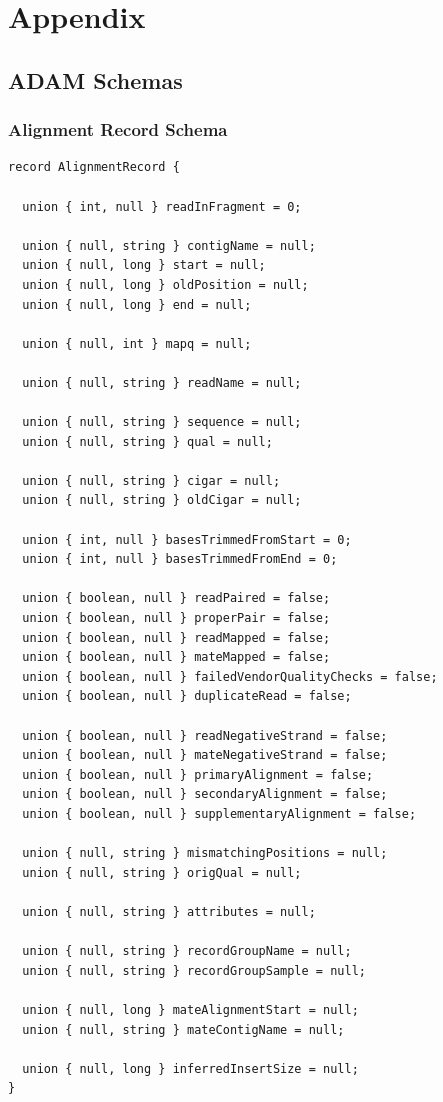 \documentclass[phd]{ucbthesis}
\begin{document}
\appendix

\part{Appendix}

\chapter{ADAM Schemas}
\label{chap:schemas}

\section{Alignment Record Schema}
\label{sec:alignment-record}

\begin{lstlisting}[caption={ADAM} read schema]
record AlignmentRecord {
 
  union { int, null } readInFragment = 0;

  union { null, string } contigName = null;
  union { null, long } start = null;
  union { null, long } oldPosition = null;
  union { null, long } end = null;

  union { null, int } mapq = null;

  union { null, string } readName = null;

  union { null, string } sequence = null;
  union { null, string } qual = null;

  union { null, string } cigar = null;
  union { null, string } oldCigar = null;

  union { int, null } basesTrimmedFromStart = 0;
  union { int, null } basesTrimmedFromEnd = 0;

  union { boolean, null } readPaired = false;
  union { boolean, null } properPair = false;
  union { boolean, null } readMapped = false;
  union { boolean, null } mateMapped = false;
  union { boolean, null } failedVendorQualityChecks = false;
  union { boolean, null } duplicateRead = false;

  union { boolean, null } readNegativeStrand = false;
  union { boolean, null } mateNegativeStrand = false;
  union { boolean, null } primaryAlignment = false;
  union { boolean, null } secondaryAlignment = false;
  union { boolean, null } supplementaryAlignment = false;

  union { null, string } mismatchingPositions = null;
  union { null, string } origQual = null;

  union { null, string } attributes = null;

  union { null, string } recordGroupName = null;
  union { null, string } recordGroupSample = null;

  union { null, long } mateAlignmentStart = null;
  union { null, string } mateContigName = null;

  union { null, long } inferredInsertSize = null;
}
\end{lstlisting}
\end{document}
